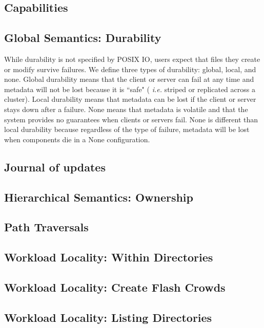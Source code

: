 \subsection{Capabilities}

\subsection{Global Semantics: Durability}

While durability is not specified by POSIX IO, users expect that files they
create or modify survive failures.  We define three types of durability:
global, local, and none.  Global durability means that the client or server can
fail at any time and metadata will not be lost because it is ``safe" ({\it
i.e.} striped or replicated across a cluster). Local durability means that
metadata can be lost if the client or server stays down after a failure. None
means that metadata is volatile and that the system provides no guarantees when
clients or servers fail.  None is different than local durability because
regardless of the type of failure, metadata will be lost when components die in a
None configuration.

\subsection{Journal of updates}

\subsection{Hierarchical Semantics: Ownership}
\subsection{Path Traversals}

\subsection{Workload Locality: Within Directories}
\subsection{Workload Locality: Create Flash Crowds}
\subsection{Workload Locality: Listing Directories}
